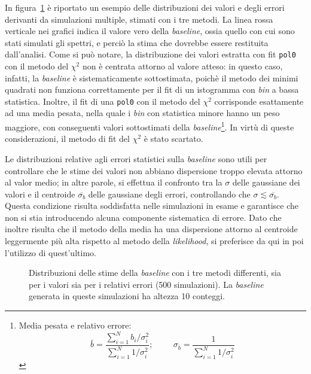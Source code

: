 \documentclass[10pt, oneside, a4paper]{article}   	%
\begin{document}
In figura~\ref{fig::baseline_500} è riportato un esempio delle distribuzioni dei valori e degli errori derivanti da simulazioni multiple, stimati con i tre metodi. La linea rossa verticale nei grafici indica il valore vero della \textit{baseline}, ossia quello con cui sono stati simulati gli spettri, e perciò la stima che dovrebbe essere restituita dall'analisi. Come si può notare, la distribuzione dei valori estratta con fit \lstinline{pol0} con il metodo del $\chi^2$ non è centrata attorno al valore atteso: in questo caso, infatti, la \textit{baseline} è sistematicamente sottostimata, poichè il metodo dei minimi quadrati non funziona correttamente per il fit di un istogramma con \emph{bin} a bassa statistica. Inoltre, il fit di una \lstinline{pol0} con il metodo del $\chi^2$ corrisponde esattamente ad una media pesata, nella quale i \emph{bin} con statistica minore hanno un peso maggiore, con conseguenti valori sottostimati della \textit{baseline}\footnote{Media pesata e relativo errore:
$$\bar{b}=\frac{\sum_{i=1}^N b_i/\sigma_i^2}{\sum_{i=1}^N 1/\sigma_i^2};
\hspace{1cm} \sigma_{\bar{b}}=\frac{1}{\sum_{i=1}^N1/\sigma_i^2}$$}. In virtù di queste considerazioni, il metodo di fit del $\chi^2$ è stato scartato. 

Le distribuzioni relative agli errori statistici sulla \textit{baseline} sono utili per controllare che le stime dei valori non abbiano dispersione troppo elevata attorno al valor medio; in altre parole, si effettua il confronto tra la $\sigma$ delle gaussiane dei valori e il centroide $\overline{\sigma_{b}}$ delle gaussiane degli errori, controllando che $\sigma\lesssim \overline{\sigma_{b}}$. Questa condizione risulta soddisfatta nelle simulazioni in esame e garantisce che non si stia introducendo alcuna componente sistematica di errore. Dato che inoltre risulta che il metodo della media ha una dispersione attorno al centroide leggermente più alta rispetto al metodo della \textit{likelihood}, si preferisce da qui in poi l'utilizzo di quest'ultimo.
%
\begin{figure}[H]
 \centerline{}
 \caption{Distribuzioni delle stime della \textit{baseline} con i tre metodi differenti, sia per i valori sia per i relativi errori (500 simulazioni). La \textit{baseline} generata in queste simulazioni ha altezza 10 conteggi.}\label{fig::baseline_500}
\end{figure}
%
\end{document}
